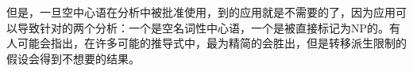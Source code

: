   但是，一旦空中心语在分析中被批准使用，到的应用就是不需要的了，因为应用可以导致针对的两个分析：一个是空名词性中心语，一个是被直接标记为NP的。有人可能会指出，在许多可能的推导式中，最为精简的会胜出，但是转移派生限制的假设会得到不想要的结果\citep[\S~5]{Pullum2013a}。

